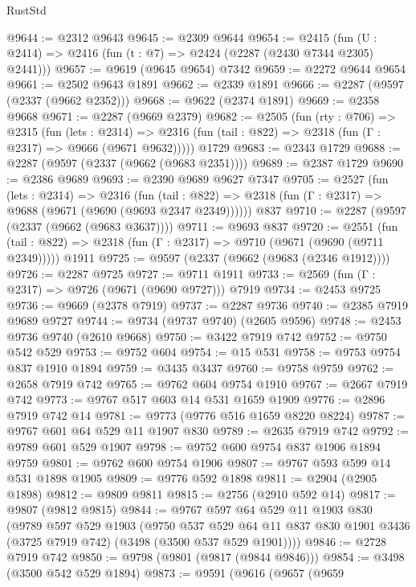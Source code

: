 \begin{lexlean}{RustStd}
\begin{coremodule}
@9644 := @2312 @9643
@9645 := @2309 @9644
@9654 := @2415 (fun (U : @2414) => @2416 (fun (t : @7) => @2424 (@2287 (@2430 @7344 @2305) @2441)))
@9657 := @9619 (@9645 @9654) @7342
@9659 := @2272 @9644 @9654
@9661 := @2502 @9643 @1891
@9662 := @2339 @1891
@9666 := @2287 (@9597 (@2337 (@9662 @2352)))
@9668 := @9622 (@2374 @1891)
@9669 := @2358 @9668
@9671 := @2287 (@9669 @2379)
@9682 := @2505
    (fun (rty : @706) =>
    @2315
      (fun (lets : @2314) =>
      @2316 (fun (tail : @822) => @2318 (fun (Γ : @2317) => @9666 (@9671 @9632)))))
    @1729
@9683 := @2343 @1729
@9688 := @2287 (@9597 (@2337 (@9662 (@9683 @2351))))
@9689 := @2387 @1729
@9690 := @2386 @9689
@9693 := @2390 @9689 @9627 @7347
@9705 := @2527
    (fun (lets : @2314) =>
    @2316
      (fun (tail : @822) => @2318 (fun (Γ : @2317) => @9688 (@9671 (@9690 (@9693 @2347 @2349))))))
    @837
@9710 := @2287 (@9597 (@2337 (@9662 (@9683 @3637))))
@9711 := @9693 @837
@9720 := @2551
    (fun (tail : @822) => @2318 (fun (Γ : @2317) => @9710 (@9671 (@9690 (@9711 @2349)))))
    @1911
@9725 := @9597 (@2337 (@9662 (@9683 (@2346 @1912))))
@9726 := @2287 @9725
@9727 := @9711 @1911
@9733 := @2569 (fun (Γ : @2317) => @9726 (@9671 (@9690 @9727))) @7919
@9734 := @2453 @9725
@9736 := @9669 (@2378 @7919)
@9737 := @2287 @9736
@9740 := @2385 @7919 @9689 @9727
@9744 := @9734 (@9737 @9740) (@2605 @9596)
@9748 := @2453 @9736 @9740 (@2610 @9668)
@9750 := @3422 @7919 @742
@9752 := @9750 @542 @529
@9753 := @9752 @604
@9754 := @15 @531
@9758 := @9753 @9754 @837 @1910 @1894
@9759 := @3435 @3437
@9760 := @9758 @9759
@9762 := @2658 @7919 @742
@9765 := @9762 @604 @9754 @1910
@9767 := @2667 @7919 @742
@9773 := @9767 @517 @603 @14 @531 @1659 @1909
@9776 := @2896 @7919 @742 @14
@9781 := @9773 (@9776 @516 @1659 @8220 @8224)
@9787 := @9767 @601 @64 @529 @11 @1907 @830
@9789 := @2635 @7919 @742
@9792 := @9789 @601 @529 @1907
@9798 := @9752 @600 @9754 @837 @1906 @1894 @9759
@9801 := @9762 @600 @9754 @1906
@9807 := @9767 @593 @599 @14 @531 @1898 @1905
@9809 := @9776 @592 @1898
@9811 := @2904 (@2905 @1898)
@9812 := @9809 @9811
@9815 := @2756 (@2910 @592 @14)
@9817 := @9807 (@9812 @9815)
@9844 := @9767
    @597
    @64
    @529
    @11
    @1903
    @830
    (@9789
      @597
      @529
      @1903
      (@9750
        @537
        @529
        @64
        @11
        @837
        @830
        @1901
        @3436
        (@3725 @7919 @742)
        (@3498 (@3500 @537 @529 @1901))))
@9846 := @2728 @7919 @742
@9850 := @9798 (@9801 (@9817 (@9844 @9846)))
@9854 := @3498 (@3500 @542 @529 @1894)
@9873 := @9591
    (@9616
      (@9657
        (@9659

\end{coremodule}
\end{lexlean}
